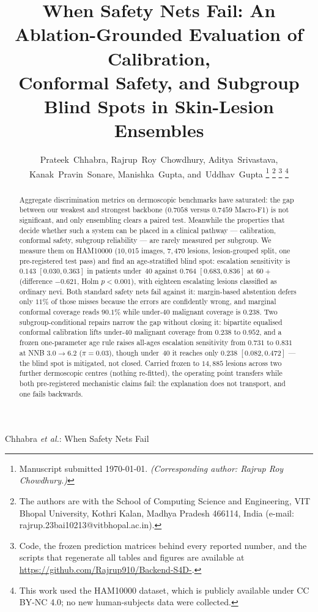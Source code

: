 \documentclass[journal]{IEEEtran}
\begin{document}
\title{When Safety Nets Fail: An Ablation-Grounded Evaluation of Calibration,\\
Conformal Safety, and Subgroup Blind Spots in Skin-Lesion Ensembles}

\author{Prateek~Chhabra,
        Rajrup~Roy~Chowdhury,
        Aditya~Srivastava,
        Kanak~Pravin~Sonare,
        Manishka~Gupta,
        and~Uddhav~Gupta%
\thanks{Manuscript submitted \today. \emph{(Corresponding author: Rajrup Roy Chowdhury.)}}%
\thanks{The authors are with the School of Computing Science and Engineering,
VIT Bhopal University, Kothri Kalan, Madhya Pradesh 466114, India
(e-mail: rajrup.23bai10213@vitbhopal.ac.in).}%
\thanks{Code, the frozen prediction matrices behind every reported number, and the scripts
that regenerate all tables and figures are available at
\url{https://github.com/Rajrup910/Backend-S4D-}.}%
\thanks{This work used the HAM10000 dataset, which is publicly available under CC BY-NC 4.0;
no new human-subjects data were collected.}}

%
{Chhabra \MakeLowercase{\textit{et al.}}: When Safety Nets Fail}

\maketitle

\begin{abstract}
Aggregate discrimination metrics on dermoscopic benchmarks have saturated: the gap between
our weakest and strongest backbone ($0.7058$ versus $0.7459$ Macro-F1) is not significant,
and only ensembling clears a paired test. Meanwhile the properties that decide whether such a
system can be placed in a clinical pathway --- calibration, conformal safety, subgroup
reliability --- are rarely measured per subgroup. We measure them on HAM10000 ($10{,}015$ images,
$7{,}470$ lesions, lesion-grouped split, one pre-registered test pass) and find an
age-stratified blind spot: escalation sensitivity is $0.143$ $[0.030, 0.363]$ in patients
under~$40$ against $0.764$ $[0.683, 0.836]$ at $60+$ (difference $-0.621$, Holm $p<0.001$),
with eighteen escalating lesions classified as ordinary nevi. Both standard safety nets fail
against it: margin-based abstention defers only $11\%$ of those misses because the errors are
confidently wrong, and marginal conformal coverage reads $90.1\%$ while under-$40$ malignant
coverage is $0.238$. Two subgroup-conditional repairs narrow the gap without closing it:
bipartite equalised conformal calibration lifts under-$40$ malignant coverage from $0.238$ to
$0.952$, and a frozen one-parameter age rule raises all-ages escalation sensitivity from
$0.731$ to $0.831$ at NNB $3.0\rightarrow6.2$ ($\pi=0.03$), though under~$40$ it reaches
only $0.238$ $[0.082, 0.472]$ --- the blind spot is mitigated, not closed. Carried frozen to
$14{,}885$ lesions across two further dermoscopic centres (nothing re-fitted), the operating
point transfers while both pre-registered mechanistic claims fail: the explanation does not
transport, and one fails backwards.
\end{abstract}
\end{document}
